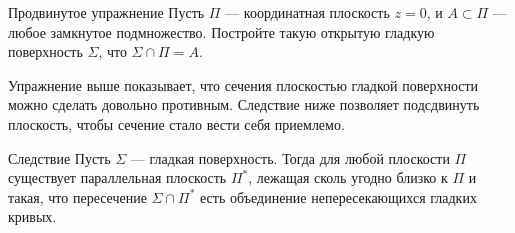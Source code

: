 \begin{thm}{Продвинутое упражнение}\label{ex:plane-section}
Пусть $\Pi$ --- координатная плоскость $z=0$, и $A \subset \Pi$ --- любое замкнутое подмножество.
Постройте такую открытую гладкую поверхность $\Sigma$, что $\Sigma \cap \Pi = A$.
\end{thm}

Упражнение выше показывает, что сечения плоскостью гладкой поверхности можно сделать довольно противным.
Следствие ниже позволяет подсдвинуть плоскость, чтобы сечение стало вести себя приемлемо.

\begin{thm}{Следствие}
Пусть $\Sigma$ --- гладкая поверхность.
Тогда для любой плоскости $\Pi$ существует параллельная плоскость $\Pi^{*}$, лежащая сколь угодно близко к $\Pi$ и такая, что пересечение $\Sigma\cap\Pi^{*}$ есть объединение непересекающихся гладких кривых.
\end{thm}
